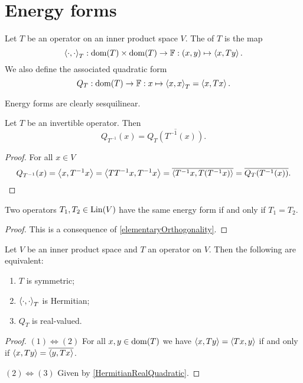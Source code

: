 \section{Energy forms}
\begin{definition}
Let $T$ be an operator on an inner product space $V$. The  of $T$ is the map
\[ \left\langle \cdot, \cdot \right\rangle_T: \operatorname{dom}(T)\times \operatorname{dom}(T) \to \mathbb{F}: (x,y) \mapsto \left\langle x,Ty \right\rangle. \]
We also define the associated quadratic form
\[ Q_T: \operatorname{dom}(T)\to \mathbb{F}: x\mapsto \left\langle x,x \right\rangle_T = \left\langle x,Tx \right\rangle. \]
\end{definition}
Energy forms are clearly sesquilinear.

\begin{lemma} \label{quadraticFormInverseOperator}
Let $T$ be an invertible operator. Then
\[ Q_{T^{-1}}(x) = \overline{Q_T(T^{-1}(x))}. \]
\end{lemma}
\begin{proof}
For all $x\in V$
\[ Q_{T^{-1}}(x) = \left\langle x,T^{-1}x \right\rangle = \left\langle TT^{-1}x, T^{-1}x \right\rangle = \overline{\left\langle T^{-1}x, T(T^{-1}x) \right\rangle} = \overline{Q_T(T^{-1}(x))}. \]
\end{proof}

\begin{lemma} \label{sameEnergyFormSameOperator}
Two operators $T_1,T_2\in \operatorname{Lin}(V)$ have the same energy form \textup{if and only if} $T_1 = T_2$.
\end{lemma}
\begin{proof}
This is a consequence of \ref{elementaryOrthogonality}.
\end{proof}

\begin{lemma} \label{energyFormHermitianSymmetric}
Let $V$ be an inner product space and $T$ an operator on $V$. Then the following are equivalent:
\begin{enumerate}
\item $T$ is symmetric;
\item $\left\langle \cdot,\cdot \right\rangle_T$ is Hermitian;
\item $Q_T$ is real-valued.
\end{enumerate}
\end{lemma}
\begin{proof}
$(1) \Leftrightarrow (2)$ For all $x,y\in \operatorname{dom}(T)$ we have $\left\langle x,Ty \right\rangle = \left\langle Tx, y \right\rangle$ if and only if $\left\langle x,Ty \right\rangle = \overline{\left\langle y, Tx \right\rangle}$.

$(2) \Leftrightarrow (3)$ Given by \ref{HermitianRealQuadratic}.
\end{proof}

